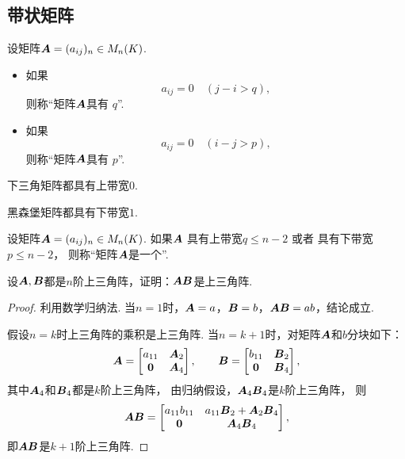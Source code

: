 \subsection{带状矩阵}
\begin{definition}
设矩阵\(\boldsymbol{A}=(a_{ij})_n \in M_n(K)\).
\begin{itemize}
	\item 如果\begin{equation*}
		a_{ij} = 0
		\quad(j-i>q),
	\end{equation*}
	则称“矩阵\(\boldsymbol{A}\)具有 \(q\)”.

	\item 如果\begin{equation*}
		a_{ij} = 0
		\quad(i-j>p),
	\end{equation*}
	则称“矩阵\(\boldsymbol{A}\)具有 \(p\)”.
\end{itemize}
\end{definition}

\begin{example}
下三角矩阵都具有上带宽\(0\).
\end{example}

\begin{example}
黑森堡矩阵都具有下带宽\(1\).
\end{example}

\begin{definition}
设矩阵\(\boldsymbol{A}=(a_{ij})_n \in M_n(K)\).
如果\(\boldsymbol{A}\)
具有上带宽\(q \leq n-2\)
或者
具有下带宽\(p \leq n-2\)，
则称“矩阵\(\boldsymbol{A}\)是一个”.
\end{definition}

\begin{example}
设\(\boldsymbol{A},\boldsymbol{B}\)都是\(n\)阶上三角阵，证明：\(\boldsymbol{A}\boldsymbol{B}\)是上三角阵.
\begin{proof}
利用数学归纳法.
当\(n=1\)时，\(\boldsymbol{A}=a\)，\(\boldsymbol{B}=b\)，\(\boldsymbol{A}\boldsymbol{B} = ab\)，结论成立.

假设\(n=k\)时上三角阵的乘积是上三角阵.
当\(n=k+1\)时，对矩阵\(\boldsymbol{A}\)和\(b\)分块如下：\begin{equation*}
	\boldsymbol{A} = \begin{bmatrix}
		a_{11} & \boldsymbol{A}_2 \\
		\boldsymbol0 & \boldsymbol{A}_4
	\end{bmatrix},
	\qquad
	\boldsymbol{B} = \begin{bmatrix}
		b_{11} & \boldsymbol{B}_2 \\
		\boldsymbol0 & \boldsymbol{B}_4
	\end{bmatrix},
\end{equation*}
其中\(\boldsymbol{A}_4\)和\(\boldsymbol{B}_4\)都是\(k\)阶上三角阵，
由归纳假设，\(\boldsymbol{A}_4 \boldsymbol{B}_4\)是\(k\)阶上三角阵，
则\begin{equation*}
	\boldsymbol{A}\boldsymbol{B} = \begin{bmatrix}
		a_{11} b_{11} & a_{11} \boldsymbol{B}_2 + \boldsymbol{A}_2 \boldsymbol{B}_4 \\
		\boldsymbol0 & \boldsymbol{A}_4 \boldsymbol{B}_4
	\end{bmatrix},
\end{equation*}
即\(\boldsymbol{A}\boldsymbol{B}\)是\(k+1\)阶上三角阵.
\end{proof}
\end{example}

